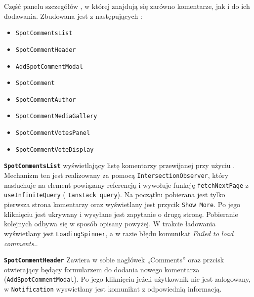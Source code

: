 \label{subsubsec:komentarze-spota}

Część panelu szczegółów , w której znajdują się zarówno komentarze, jak i 
do ich dodawania.
Zbudowana jest z następujących :
\begin{itemize}
    \item \texttt{SpotCommentsList}
    \item \texttt{SpotCommentHeader}
    \item \texttt{AddSpotCommentModal}
    \item \texttt{SpotComment}
    \item \texttt{SpotCommentAuthor}
    \item \texttt{SpotCommentMediaGallery}
    \item \texttt{SpotCommentVotesPanel}
    \item \texttt{SpotCommentVoteDisplay}
\end{itemize}

\textbf{\texttt{SpotCommentsList}}
 wyświetlający listę komentarzy przewijanej przy użyciu
.
Mechanizm ten jest realizowany za pomocą \newline \texttt{IntersectionObserver}, który nasłuchuje na element powiązany
referencją i wywołuje funkcję \texttt{fetchNextPage} z  \texttt{useInfiniteQuery}
( \texttt{tanstack query}).
Na początku pobierana jest tylko pierwsza strona komentarzy oraz wyświetlany jest przycik \texttt{Show More}.
Po jego kliknięciu jest ukrywany i wysyłane jest zapytanie o drugą stronę.
Pobieranie kolejnych odbywa się w sposób opisany powyżej.
W trakcie ładowania wyświetlany jest \texttt{LoadingSpinner}, a w razie błędu komunikat
\emph{Failed to load comments.}.

\textbf{\texttt{SpotCommentHeader}}
Zawiera w sobie nagłówek „Comments” oraz przcisk otwierający  będący formularzem
do dodania nowego komentarza (\texttt{AddSpotCommentModal}).
Po jego kliknięciu jeżeli użytkownik nie jest zalogowany, w 
\texttt{Notification} wyswietlany jest komunikat z odpowiednią informacją.


